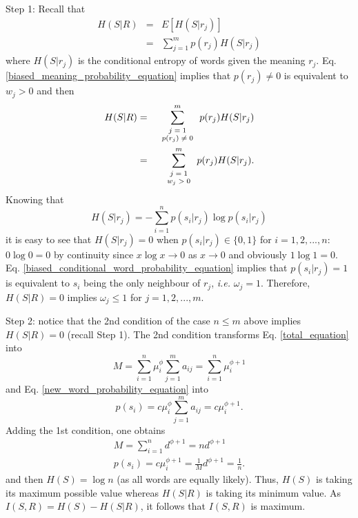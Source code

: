 \documentclass{article}
\begin{document}
Step 1: Recall that 
\begin{eqnarray*}
H(S|R) & = & E[H(S|r_j)] \\
       & = & \sum_{j=1}^m p(r_j) H(S|r_j)
\end{eqnarray*}
where $H(S|r_j)$ is the conditional entropy of words given the meaning $r_j$. 
Eq. \ref{biased_meaning_probability_equation} implies that $p(r_j) \neq 0$ is equivalent to $w_j > 0$ and then
\begin{eqnarray*}
H(S|R) & = & \sum_{\scriptsize \begin{array}{c} j=1 \\ p(r_j) \neq 0 \end{array}}^m p(r_j) H(S|r_j) \\
       & = & \sum_{\scriptsize \begin{array}{c} j=1 \\ w_j > 0  \end{array}}^m p(r_j) H(S|r_j).
\end{eqnarray*}
Knowing that
\begin{equation*} 
H(S|r_j) = -\sum_{i=1}^n p(s_i|r_j) \log p(s_i|r_j)
\end{equation*}
it is easy to see that $H(S|r_j)=0$ when $p(s_i|r_j) \in \{0,1\}$ for $i=1,2,...,n$: $0 \log 0 = 0$ by continuity since $x \log x \rightarrow 0$ as $x \rightarrow 0$ \cite[p. 14]{Cover2006a} and obviously $1 \log 1 = 0$. Eq. \ref{biased_conditional_word_probability_equation} implies that $p(s_i|r_j) = 1$ is equivalent to $s_i$ being the only neighbour of $r_j$, {\em i.e.} $\omega_j = 1$. Therefore, $H(S|R) = 0$ implies $\omega_j \leq 1$ for $j = 1,2,...,m$.  

Step 2: notice that the 2nd condition of the case $n \leq m$ above implies $H(S|R) = 0$ (recall Step 1). The 2nd condition transforms Eq. \ref{total_equation} into
\begin{equation*}
M = \sum_{i=1}^n \mu_i^\phi \sum_{j=1}^m a_{ij} = \sum_{i=1}^n \mu_i^{\phi+1}
\end{equation*}
and Eq. \ref{new_word_probability_equation} into 
\begin{equation*}
p(s_i) = c \mu_i^{\phi} \sum_{j=1}^m a_{ij} = c \mu_i^{\phi + 1}. 
\label{word_probability_with_contrast_equation}
\end{equation*}
Adding the 1st condition, one obtains
\begin{eqnarray*}
M = \sum_{i=1}^n d^{\phi+1} = n d^{\phi+1} \\
p(s_i) = c \mu_i^{\phi + 1} = \frac{1}{M} d^{\phi+1} = \frac{1}{n}. 
\end{eqnarray*}
and then $H(S) = \log n$ (as all words are equally likely).
Thus, $H(S)$ is taking its maximum possible value whereas $H(S|R)$ is taking its minimum value. As
$I(S,R) = H(S)-H(S|R)$, it follows that $I(S, R)$ is maximum. 
\end{document}
